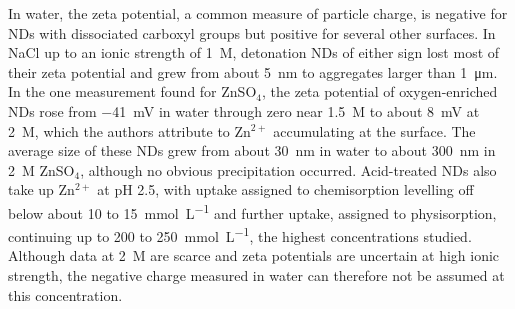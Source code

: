 In water, the zeta potential, a common measure of particle charge, is negative for NDs with dissociated carboxyl groups\cite{gines_positive_2017,girard_surface_2011} but positive for several other surfaces\cite{gines_positive_2017,girard_surface_2011,paci_understanding_2013}.
In NaCl up to an ionic strength of \SI{1}{M}, detonation NDs of either sign lost most of their zeta potential and grew from about \SI{5}{nm} to aggregates larger than \SI{1}{\um}\cite{bradac_influence_2018}.
In the one measurement found for ZnSO$_4$, the zeta potential of oxygen-enriched NDs rose from \SI{-41}{mV} in water through zero near \SI{1.5}{M} to about \SI[retain-explicit-plus]{+8}{mV} at \SI{2}{M}, which the authors attribute to Zn$^{2+}$ accumulating at the surface\cite{ding_bioinspired_2025}.
The average size of these NDs grew from about \SI{30}{nm} in water to about \SI{300}{nm} in \SI{2}{M} ZnSO$_4$, although no obvious precipitation occurred\cite{ding_bioinspired_2025}.
Acid-treated NDs also take up Zn$^{2+}$ at pH 2.5, with uptake assigned to chemisorption levelling off below about 10 to \SI{15}{mmol.L^{-1}} and further uptake, assigned to physisorption, continuing up to 200 to \SI{250}{mmol.L^{-1}}, the highest concentrations studied\cite{volkov_pristine_2020}.
Although data at \SI{2}{M} are scarce and zeta potentials are uncertain at high ionic strength\cite{bradac_influence_2018}, the negative charge measured in water can therefore not be assumed at this concentration.

